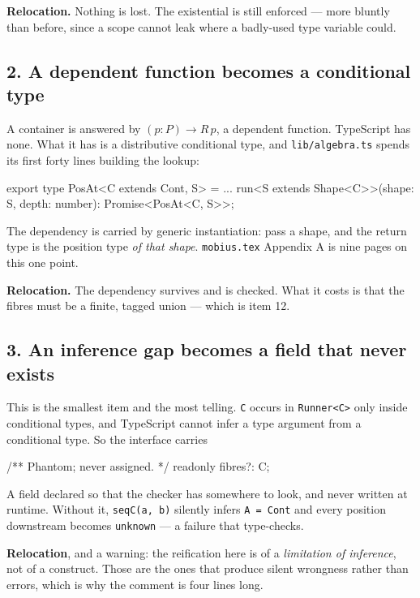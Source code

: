 \documentclass[11pt,a4paper]{article}
\begin{document}
\textbf{Relocation.} Nothing is lost. The existential is still enforced --- more
bluntly than before, since a scope cannot leak where a badly-used type
variable could.

\subsection*{2. A dependent function becomes a conditional type}

A container is answered by $(p : P) \to R\,p$, a dependent function. TypeScript
has none. What it has is a distributive conditional type, and
\texttt{lib/algebra.ts} spends its first forty lines building the lookup:

\begin{term}
export type PosAt<C extends Cont, S> = ...
run<S extends Shape<C>>(shape: S, depth: number): Promise<PosAt<C, S>>;
\end{term}

The dependency is carried by generic instantiation: pass a shape, and the
return type is the position type \emph{of that shape}. \texttt{mobius.tex}
Appendix A is nine pages on this one point.

\textbf{Relocation.} The dependency survives and is checked. What it costs is
that the fibres must be a finite, tagged union --- which is item 12.

\subsection*{3. An inference gap becomes a field that never exists}

This is the smallest item and the most telling. \texttt{C} occurs in
\texttt{Runner<C>} only inside conditional types, and TypeScript cannot infer a
type argument from a conditional type. So the interface carries

\begin{term}
/** Phantom; never assigned. */
readonly fibres?: C;
\end{term}

A field declared so that the checker has somewhere to look, and never written
at runtime. Without it, \texttt{seqC(a, b)} silently infers \texttt{A = Cont}
and every position downstream becomes \texttt{unknown} --- a failure that
type-checks.

\textbf{Relocation}, and a warning: the reification here is of a
\emph{limitation of inference}, not of a construct. Those are the ones that
produce silent wrongness rather than errors, which is why the comment is four
lines long.
\end{document}
